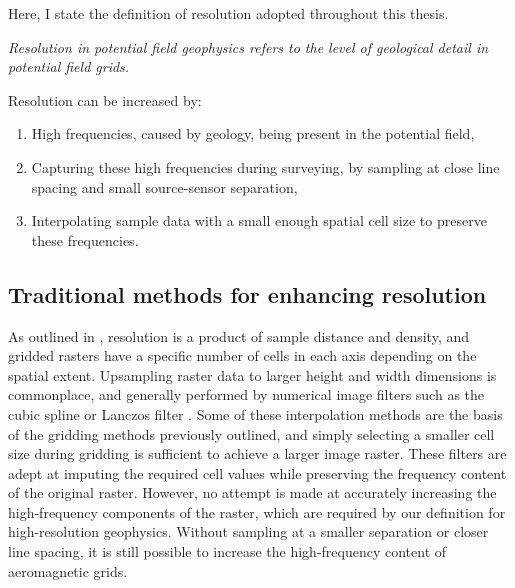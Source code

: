 Here, I state the definition of resolution adopted throughout this thesis.

\bigskip{}
\noindent{}\emph{Resolution in potential field geophysics refers to the level of geological detail in potential field grids.}
\bigskip{}

Resolution can be increased by:
\begin{enumerate}
    \item{} High frequencies, caused by geology, being present in the potential field,
    \item{} Capturing these high frequencies during surveying, by sampling at close line spacing and small source-sensor separation,
    \item{} Interpolating sample data with a small enough spatial cell size to preserve these frequencies.
\end{enumerate}

%

\subsection{Traditional methods for enhancing resolution}
As outlined in , resolution is a product of sample distance and density, and gridded rasters have a specific number of cells in each axis depending on the spatial extent.
Upsampling raster data to larger height and width dimensions is commonplace, and generally performed by numerical image filters such as the cubic spline \parencite{keysCubicConvolutionInterpolation1981} or Lanczos filter \parencite{lanczos1988applied}.
Some of these interpolation methods are the basis of the gridding methods previously outlined, and simply selecting a smaller cell size during gridding is sufficient to achieve a larger image raster.
These filters are adept at imputing the required cell values while preserving the frequency content of the original raster.
However, no attempt is made at accurately increasing the high-frequency components of the raster, which are required by our definition for high-resolution geophysics.
Without sampling at a smaller separation or closer line spacing, it is still possible to increase the high-frequency content of aeromagnetic grids.

